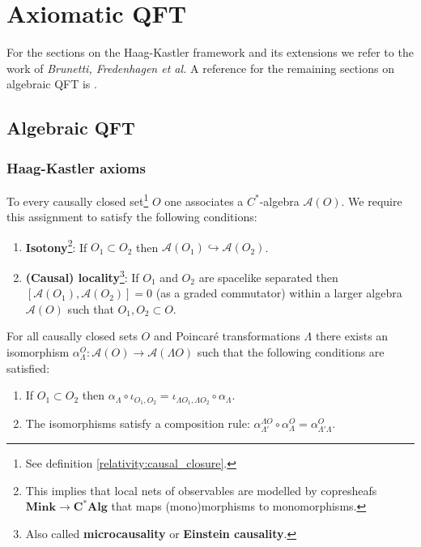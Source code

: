 \chapter{Axiomatic QFT}

    For the sections on the Haag-Kastler framework and its extensions we refer to the work of \textit{Brunetti, Fredenhagen et al.} A reference for the remaining sections on algebraic QFT is \cite{baez_aqft}.

\section{Algebraic QFT}
\subsection{Haag-Kastler axioms}

    \begin{axiom}\label{qft:microcausality}
        To every causally closed set\footnote{See definition \ref{relativity:causal_closure}.} $O$ one associates a $C^*$-algebra $\mathcal{A}(O)$. We require this assignment to satisfy the following conditions:
        \begin{enumerate}
            \item \textbf{Isotony}\footnote{This implies that local nets of observables are modelled by copresheafs $\mathbf{Mink}\rightarrow\mathbf{C^*Alg}$ that maps (mono)morphisms to monomorphisms.}: If $O_1\subset O_2$ then $\mathcal{A}(O_1)\hookrightarrow\mathcal{A}(O_2)$.
            \item \textbf{(Causal) locality}\footnote{Also called \textbf{microcausality} or \textbf{Einstein causality}.}: If $O_1$ and $O_2$ are spacelike separated then $[\mathcal{A}(O_1), \mathcal{A}(O_2)] = 0$ (as a graded commutator) within a larger algebra $\mathcal{A}(O)$ such that $O_1, O_2\subset O$.
        \end{enumerate}
    \end{axiom}

    \begin{axiom}
        For all causally closed sets $O$ and Poincar\'e transformations $\Lambda$ there exists an isomorphism $\alpha^O_\Lambda:\mathcal{A}(O)\rightarrow\mathcal{A}(\Lambda O)$ such that the following conditions are satisfied:
        \begin{enumerate}
            \item If $O_1\subset O_2$ then $\alpha_\Lambda\circ\iota_{O_1,O_2} = \iota_{\Lambda O_1, \Lambda O_2}\circ\alpha_\Lambda$.
            \item The isomorphisms satisfy a composition rule: $\alpha^{\Lambda O}_{\Lambda'}\circ\alpha^O_\Lambda = \alpha^O_{\Lambda'\Lambda}$.
        \end{enumerate}
    \end{axiom}

